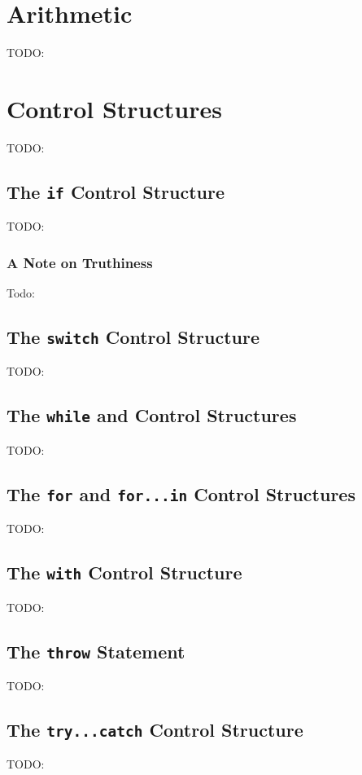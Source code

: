 \documentclass[11pt,letter]{book}
\begin{document}
    \section{Arithmetic}
    TODO:
    
    \section{Control Structures}
    TODO:
    
    \subsection{The \texttt{if} Control Structure}
    TODO:
    
    \subsubsection{A Note on Truthiness}
    Todo:
    
    \subsection{The \texttt{switch} Control Structure}
    TODO:
    
    \subsection{The \texttt{while} and  Control Structures}
    TODO:
    
    \subsection{The \texttt{for} and \texttt{for...in} Control Structures}
    TODO:
    
    \subsection{The \texttt{with} Control Structure}
    TODO:
    
    \subsection{The \texttt{throw} Statement}
    TODO:
    
    \subsection{The \texttt{try...catch} Control Structure}
    TODO:
    
\end{document}
